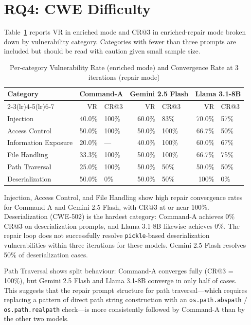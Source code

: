 \documentclass[12pt,a4paper]{report}
\begin{document}
\section{RQ4: CWE Difficulty}
\label{sec:rq4}

Table~\ref{tab:category} reports VR in enriched mode and CR@3 in enriched-repair
mode broken down by vulnerability category. Categories with fewer than three
prompts are included but should be read with caution given small sample size.

\begin{table}[H]
\centering
\caption{Per-category Vulnerability Rate (enriched mode) and Convergence Rate
         at 3 iterations (repair mode)}
\label{tab:category}
\renewcommand{\arraystretch}{1.3}
\begin{tabularx}{\textwidth}{@{}lrXrXrX@{}}
\toprule
\multirow{2}{*}{\textbf{Category}}
  & \multicolumn{2}{c}{\textbf{Command-A}}
  & \multicolumn{2}{c}{\textbf{Gemini 2.5 Flash}}
  & \multicolumn{2}{c}{\textbf{Llama 3.1-8B}} \\
\cmidrule(lr){2-3}\cmidrule(lr){4-5}\cmidrule(lr){6-7}
  & VR & CR@3 & VR & CR@3 & VR & CR@3 \\
\midrule
Injection           & 40.0\% & 100\% & 60.0\% & 83\% & 70.0\% & 57\% \\
Access Control      & 50.0\% & 100\% & 50.0\% & 100\% & 66.7\% & 50\% \\
Information Exposure& 20.0\% &  ---  & 40.0\% & 100\% & 60.0\% & 67\% \\
File Handling       & 33.3\% & 100\% & 50.0\% & 100\% & 66.7\% & 75\% \\
Path Traversal      & 25.0\% & 100\% & 50.0\% &  50\% & 50.0\% & 50\% \\
Deserialization     & 50.0\% &   0\% & 50.0\% &  50\% & 100\%  &  0\% \\
\bottomrule
\end{tabularx}
\end{table}

Injection, Access Control, and File Handling show high repair convergence rates
for Command-A and Gemini 2.5 Flash, with CR@3 at or near 100\%. Deserialization
(CWE-502) is the hardest category: Command-A achieves 0\% CR@3 on deserialization
prompts, and Llama 3.1-8B likewise achieves 0\%. The repair loop does not
successfully resolve \texttt{pickle}-based deserialization vulnerabilities within
three iterations for these models. Gemini 2.5 Flash resolves 50\% of
deserialization cases.

Path Traversal shows split behaviour: Command-A converges fully (CR@3 = 100\%),
but Gemini 2.5 Flash and Llama 3.1-8B converge in only half of cases. This
suggests that the repair prompt structure for path traversal---which requires
replacing a pattern of direct path string construction with an
\texttt{os.path.abspath} / \texttt{os.path.realpath} check---is more
consistently followed by Command-A than by the other two models.
\end{document}
